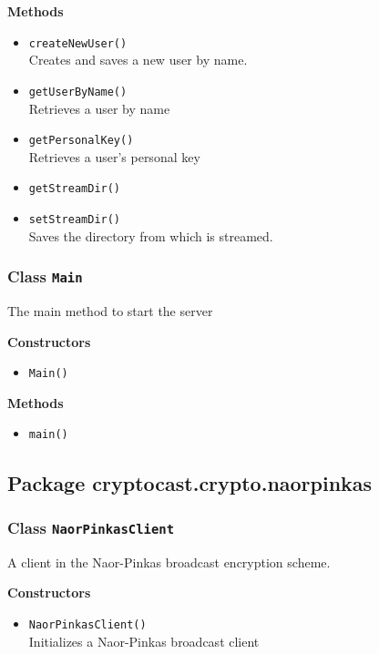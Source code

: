 \textbf{Methods}
\begin{itemize}
\item \lstinline|createNewUser()| \\
Creates and saves a new user by name.

\item \lstinline|getUserByName()| \\
Retrieves a user by name

\item \lstinline|getPersonalKey()| \\
Retrieves a user's personal key

\item \lstinline|getStreamDir()| \\


\item \lstinline|setStreamDir()| \\
Saves the directory from which is streamed.

\end{itemize}

\subsubsection{Class \lstinline|Main|}
The main method to start the server

\textbf{Constructors}
\begin{itemize}
\item \lstinline|Main()| \\


\end{itemize}

\textbf{Methods}
\begin{itemize}
\item \lstinline|main()| \\


\end{itemize}


\subsection{Package cryptocast.crypto.naorpinkas}
\subsubsection{Class \lstinline|NaorPinkasClient|}
A client in the Naor-Pinkas broadcast encryption scheme.

\textbf{Constructors}
\begin{itemize}
\item \lstinline|NaorPinkasClient()| \\
Initializes a Naor-Pinkas broadcast client

\end{itemize}

